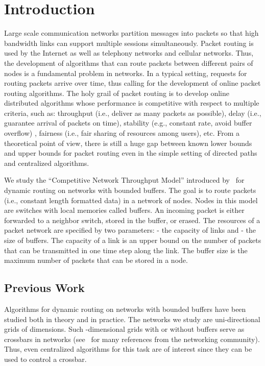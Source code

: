 \documentclass[11pt]{article}
\newenvironment{proof sketch}[1]{\noindent {\emph{Proof sketch of #1:}}}{\hfill \qed}
\begin{document}
\section{Introduction}
Large scale communication networks partition messages into packets so that high
bandwidth links can support multiple sessions simultaneously. Packet routing is used
by the Internet as well as telephony networks and cellular networks. Thus, the
development of algorithms that can route packets between different pairs of nodes is
a fundamental problem in networks. In a typical setting, requests for routing packets
arrive over time, thus calling for the development of online packet routing
algorithms. The holy grail of packet routing is to develop online distributed
algorithms whose performance is competitive with respect to multiple criteria, such
as: throughput (i.e., deliver as many packets as possible), delay (i.e., guarantee
arrival of packets on time), stability (e.g., constant rate, avoid buffer overflow) ,
fairness (i.e., fair sharing of resources among users), etc.  From a theoretical
point of view, there is still a huge gap between known lower bounds and upper bounds
for packet routing even in the simple setting of directed paths and centralized
algorithms.


We study the ``Competitive Network Throughput Model'' introduced by~\cite{AKOR} for
dynamic routing on networks with bounded buffers.  The goal is to route packets
(i.e., constant length formatted data) in a network of  nodes.  Nodes in this
model are switches with local memories called buffers.  An incoming packet is either
forwarded to a neighbor switch, stored in the buffer, or erased. The resources of a
packet network are specified by two parameters:  - the capacity of links and  -
the size of buffers.  The capacity of a link is an upper bound on the number of
packets that can be transmitted in one time step along the link.  The buffer size is
the maximum number of packets that can be stored in a node.


\subsection{Previous Work}
Algorithms for dynamic routing on networks with bounded
buffers have been studied both in theory and in practice.
The networks we study are uni-directional grids of 
dimensions. Such -dimensional grids with or without
buffers serve as crossbars in networks
(see~\cite{ARSU,AKRR,T} for many references from the
networking community). Thus, even centralized algorithms
for this task are of interest since they can be used to
control a crossbar.
\end{document}

